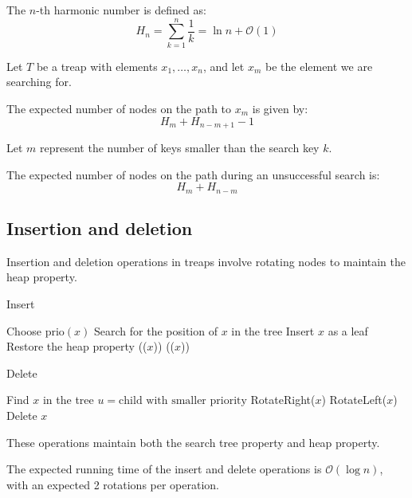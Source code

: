 \begin{definition}
    The $n$-th harmonic number is defined as:
    \[H_n=\sum_{k=1}^n\dfrac{1}{k}=\ln n + \mathcal{O}(1)\]    
\end{definition}
Let $T$ be a treap with elements $x_1, \dots, x_n$, and let $x_m$ be the element we are searching for.
\begin{lemma}
    The expected number of nodes on the path to $x_m$ is given by:
    \[H_{m}+H_{n-m+1}-1\]
\end{lemma}
Let $m$ represent the number of keys smaller than the search key $k$.
\begin{lemma}
    The expected number of nodes on the path during an unsuccessful search is:
    \[H_{m}+H_{n-m}\] 
\end{lemma}

\subsection{Insertion and deletion}
Insertion and deletion operations in treaps involve rotating nodes to maintain the heap property.
\begin{algorithm}[H]
    \caption{Insert}
    \begin{algorithmic}[1]
        \State Choose $\text{prio}(x)$
        \State Search for the position of $x$ in the tree
        \State Insert $x$ as a leaf
         \Comment Restore the heap property
                \State {}(($x$))
            \Else 
                \State {}(($x$))
            \EndIf
        \EndWhile
    \end{algorithmic}
\end{algorithm}
\begin{algorithm}[H]
    \caption{Delete}
    \begin{algorithmic}[1]
        \State Find $x$ in the tree
            \State $u = \text{child with smaller priority}$
                \State RotateRight($x$)
            \Else 
                \State RotateLeft($x$)
            \EndIf
        \EndWhile
        \State Delete $x$
    \end{algorithmic}
\end{algorithm}
These operations maintain both the search tree property and heap property.
\begin{lemma}
    The expected running time of the insert and delete operations is $\mathcal{O}(\log n)$, with an expected 2 rotations per operation.
\end{lemma}

